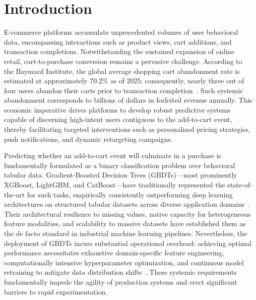 \documentclass[conference]{IEEEtran}
\begin{document}
\section{Introduction}
E-commerce platforms accumulate unprecedented volumes of user behavioral data, encompassing interactions such as product views, cart additions, and transaction completions. Notwithstanding the sustained expansion of online retail, cart-to-purchase conversion remains a pervasive challenge. According to the Baymard Institute, the global average shopping cart abandonment rate is estimated at approximately 70.2\% as of 2025; consequently, nearly three out of four users abandon their carts prior to transaction completion~\cite{baymard2025}. Such systemic abandonment corresponds to billions of dollars in forfeited revenue annually. This economic imperative drives platforms to develop robust predictive systems capable of discerning high-intent users contiguous to the add-to-cart event, thereby facilitating targeted interventions such as personalized pricing strategies, push notifications, and dynamic retargeting campaigns.

Predicting whether an add-to-cart event will culminate in a purchase is fundamentally formulated as a binary classification problem over behavioral tabular data. Gradient-Boosted Decision Trees (GBDTs)---most prominently XGBoost, LightGBM, and CatBoost---have traditionally represented the state-of-the-art for such tasks, empirically consistently outperforming deep learning architectures on structured tabular datasets across diverse application domains~\cite{chen2016xgboost,ke2017lightgbm,prokhorenkova2018catboost,grinsztajn2022tree}. Their architectural resilience to missing values, native capacity for heterogeneous feature modalities, and scalability to massive datasets have established them as the de facto standard in industrial machine learning pipelines. Nevertheless, the deployment of GBDTs incurs substantial operational overhead: achieving optimal performance necessitates exhaustive domain-specific feature engineering, computationally intensive hyperparameter optimization, and continuous model retraining to mitigate data distribution shifts~\cite{shwartzziv2022tabular,sculley2015hidden}. These systemic requirements fundamentally impede the agility of production systems and erect significant barriers to rapid experimentation.
\end{document}
